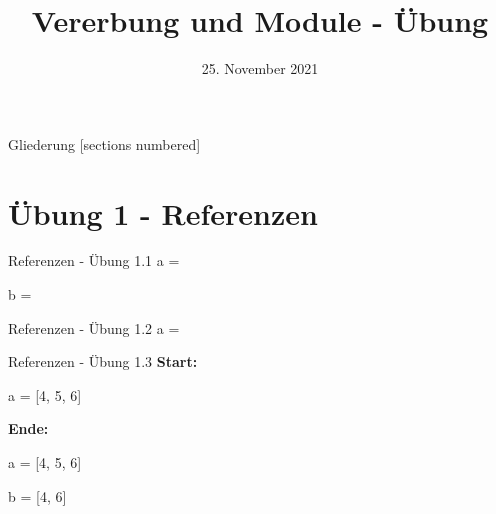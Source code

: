 



\title{Vererbung und Module - Übung}
\date{25. November 2021}


\maketitle

\begin{frame}{Gliederung}
	[sections numbered]
	\tableofcontents
\end{frame}

\section{Übung 1 - Referenzen}
\begin{frame}{Referenzen - Übung 1.1}
	\large
	a = \only<1>{?}\only<2>{\alert{[ [1, 5], [1, 5] ]}}
	
	b = \only<2>{\alert{[1, 5]}}
\end{frame}


\begin{frame}{Referenzen - Übung 1.2}
	\large
	a = \only<2>{\alert{[2, 3]}}
\end{frame}

\begin{frame}{Referenzen - Übung 1.3}
	\only<1>{
		\large
		
		\large
	}
	\only<2>{
		\large
		
	}
	\textbf{Start:}
	
	a = [4, 5, 6]
	\linebreak
	
	\textbf{Ende:}
	
	a = [4, 5, 6]
	
	b = [4, 6]
\end{frame}

